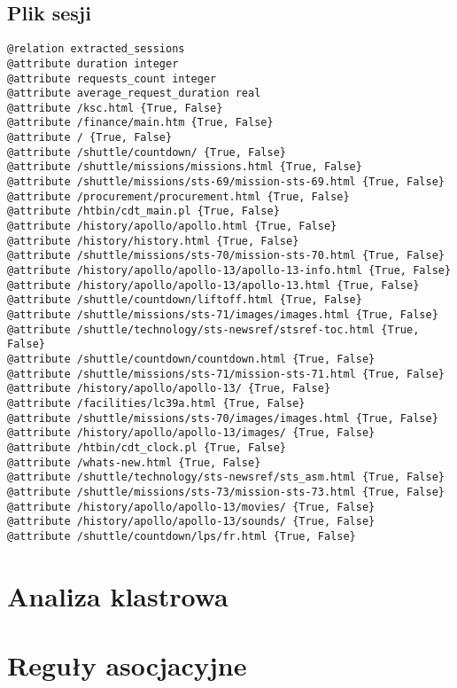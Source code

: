 \documentclass{classrep}
\begin{document}
{        \subsection{Plik sesji} {
            \begin{lstlisting}
@relation extracted_sessions
@attribute duration integer
@attribute requests_count integer
@attribute average_request_duration real
@attribute /ksc.html {True, False}
@attribute /finance/main.htm {True, False}
@attribute / {True, False}
@attribute /shuttle/countdown/ {True, False}
@attribute /shuttle/missions/missions.html {True, False}
@attribute /shuttle/missions/sts-69/mission-sts-69.html {True, False}
@attribute /procurement/procurement.html {True, False}
@attribute /htbin/cdt_main.pl {True, False}
@attribute /history/apollo/apollo.html {True, False}
@attribute /history/history.html {True, False}
@attribute /shuttle/missions/sts-70/mission-sts-70.html {True, False}
@attribute /history/apollo/apollo-13/apollo-13-info.html {True, False}
@attribute /history/apollo/apollo-13/apollo-13.html {True, False}
@attribute /shuttle/countdown/liftoff.html {True, False}
@attribute /shuttle/missions/sts-71/images/images.html {True, False}
@attribute /shuttle/technology/sts-newsref/stsref-toc.html {True, False}
@attribute /shuttle/countdown/countdown.html {True, False}
@attribute /shuttle/missions/sts-71/mission-sts-71.html {True, False}
@attribute /history/apollo/apollo-13/ {True, False}
@attribute /facilities/lc39a.html {True, False}
@attribute /shuttle/missions/sts-70/images/images.html {True, False}
@attribute /history/apollo/apollo-13/images/ {True, False}
@attribute /htbin/cdt_clock.pl {True, False}
@attribute /whats-new.html {True, False}
@attribute /shuttle/technology/sts-newsref/sts_asm.html {True, False}
@attribute /shuttle/missions/sts-73/mission-sts-73.html {True, False}
@attribute /history/apollo/apollo-13/movies/ {True, False}
@attribute /history/apollo/apollo-13/sounds/ {True, False}
@attribute /shuttle/countdown/lps/fr.html {True, False}
            \end{lstlisting}
        }
    }

    \section{Analiza klastrowa} {
        
    }

    \section{Reguły asocjacyjne} {
        
    }

    \begin{thebibliography}{0}
    \end{thebibliography}
\end{document}

